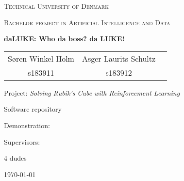 \documentclass[12pt, fleqn]{report}
\begin{document}
\begin{titlepage}
    \centering
    {\scshape\LARGE Technical University of Denmark \par}
    \vspace{1cm}
    {\scshape\Large Bachelor project in Artificial Intelligence and Data\par}
    \vspace{1.5cm}
    {\huge\bfseries daLUKE: Who da boss? da LUKE! \par}
    \vspace{2cm}
    \begin{large}
        \centering
        \begin{tabular}{ccc}
                Søren Winkel Holm & Asger Laurits Schultz\\
                s183911 & s183912
        \end{tabular}
    \end{large}\par
    \vfill
    Project: \textit{Solving Rubik's Cube with Reinforcement Learning}\par
    Software repository
    \par
    Demonstration:
    \par
    \vspace{2cm}
    Supervisors:\par
    4 dudes
    \vfill
    {\large \today\par}
\end{titlepage}
\begin{abstract}
    Every heard of LUKE skyWALKER? Now he do be speaking danglish \cite{yamada2020luke}
\end{abstract}

\setcounter{tocdepth}{1}
\tableofcontents
\setcounter{tocdepth}{2}

% 

% 

% 

% 

% 

% 

\printbibliography[heading=bibintoc]

% 
\end{document}

